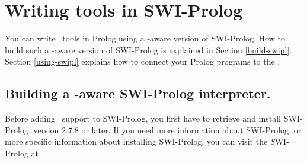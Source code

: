 
\section{\label{ToolsInSwipl}Writing tools in SWI-Prolog}

You can write \TB\ tools in Prolog using a \TB -aware version of
SWI-Prolog.
How to build such a \TB -aware version of SWI-Prolog is explained in
Section \ref{build-swipl}. Section \ref{using-swipl} explains how
to connect your Prolog programs to the \TB.

\subsection{\label{build-swipl}Building a \TB -aware SWI-Prolog interpreter.}

Before adding \TB\ support to SWI-Prolog, you first have to retrieve and
install SWI-Prolog, version 2.7.8 or later.
If you need more information about SWI-Prolog, or more
specific information about installing SWI-Prolog, you can visit the
{\emph SWI-Prolog} at 
